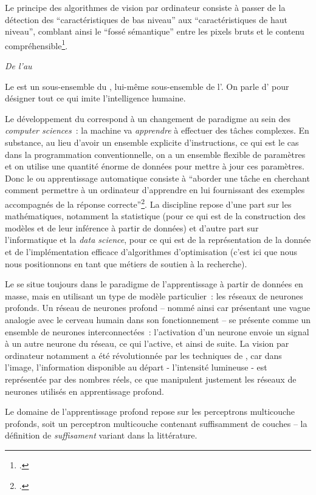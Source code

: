 Le principe des algorithmes de vision par ordinateur consiste à passer
de la détection des \enquote{caractéristiques de bas niveau} aux
\enquote{caractéristiques de haut niveau}, comblant ainsi le \enquote{fossé
sémantique} entre les pixels bruts et le contenu
compréhensible\footcite{klinke_big_2016}.

\emph{De l'\ia au \dl}

Le \dl est un sous-ensemble du \ml,
lui-même sous-ensemble de l'\ia. On parle d'\ia
pour désigner tout ce qui imite l'intelligence humaine.

Le développement du \ml correspond à un changement
de paradigme au sein des \textit{computer sciences}~: la machine va
\emph{apprendre} à effectuer des tâches complexes. En substance, au lieu d'avoir
un ensemble explicite d'instructions, ce qui est le cas dans la
programmation conventionnelle, on a un ensemble flexible de paramètres
et on utilise une quantité énorme de données pour mettre à jour ces
paramètres. Donc le \ml ou apprentissage automatique
consiste à ``aborder une tâche en cherchant comment permettre à un
ordinateur d'apprendre en lui fournissant des exemples accompagnés de la
réponse correcte''\footcite[p.3]{charniak_introduction_2021}. La
discipline repose d'une part sur les mathématiques, notamment la
statistique (pour ce qui est de la construction des modèles et de leur
inférence à partir de données) et d'autre part sur l'informatique et la
\emph{data science}, pour ce qui est de la représentation de la donnée
et de l'implémentation efficace d'algorithmes d'optimisation (c'est ici
que nous nous positionnons en tant que métiers de soutien à la
recherche).

Le \dl se situe toujours dans le paradigme de
l'apprentissage à partir de données en masse, mais en utilisant un type de
modèle particulier~: les réseaux de neurones profonds. Un réseau de
neurones profond -- nommé ainsi car présentant une vague analogie avec le cerveau humain dans son fonctionnement -- se présente comme un ensemble de neurones
interconnectées~:
l'activation d'un neurone envoie un signal à un autre neurone du réseau,
ce qui l'active, et ainsi de suite. La vision par ordinateur notamment a
été révolutionnée par les techniques de \dl, car dans
l'image, l'information disponible au départ - l'intensité lumineuse -
est représentée par des nombres réels, ce que manipulent justement les
réseaux de neurones utilisés en apprentissage profond.

Le domaine de l'apprentissage profond repose sur les perceptrons
multicouche profonds, soit un perceptron multicouche contenant
suffisamment de couches -- la définition de \textit{suffisament} variant dans
la littérature.

